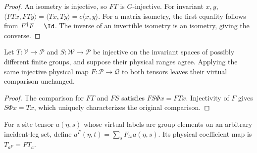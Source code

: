\begin{proof}\leanok
    An isometry is injective, so $FT$ is $G$-injective.
    For invariant $x,y$,
    $\langle FTx,FTy\rangle=\langle Tx,Ty\rangle
        =c\langle x,y\rangle$.
    For a matrix isometry, the first equality follows from
    $F^\dagger F=\Id$. The inverse of an invertible isometry is an
    isometry, giving the converse.
\end{proof}

\begin{lemma}%
    \label{thm:peps_g_injective_physical_virtual_comparison}
    \leanok
    Let $T:\mathcal V\to\mathcal P$ and
    $S:\mathcal W\to\mathcal P$ be injective on the invariant
    spaces of possibly different finite groups, and suppose their
    physical ranges agree. Applying the same injective physical map
    $F:\mathcal P\to\mathcal Q$ to both tensors leaves their
    virtual comparison unchanged.
\end{lemma}

\begin{proof}\leanok
    The comparison for $FT$ and $FS$ satisfies $FS\Phi x=FTx$.
    Injectivity of $F$ gives $S\Phi x=Tx$, which uniquely
    characterizes the original comparison.
\end{proof}

\begin{definition}%
    \label{def:peps_regular_physical_site}
    \leanok
    For a site tensor $a(\eta,s)$ whose virtual labels are group
    elements on an arbitrary incident-leg set, define
    $a^F(\eta,t)=\sum_sF_{ts}a(\eta,s)$.
    Its physical coefficient map is $T_{a^F}=FT_a$.
\end{definition}

